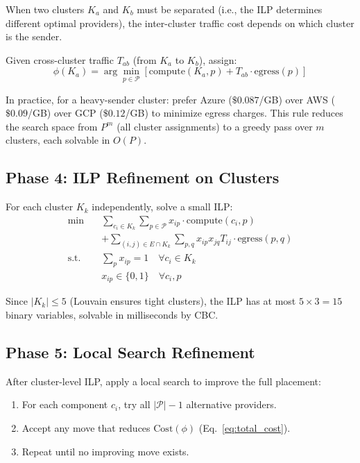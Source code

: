 \documentclass[10pt,journal,compsoc]{IEEEtran}
\begin{document}
When two clusters $K_a$ and $K_b$ must be separated (i.e., the ILP
determines different optimal providers), the inter-cluster traffic cost
depends on which cluster is the sender.

Given cross-cluster traffic $T_{ab}$ (from $K_a$ to $K_b$), assign:
\begin{equation}
\label{eq:asymmetry}
\phi(K_a) = \arg\min_{p \in \mathcal{P}} \left[ \text{compute}(K_a, p) +
             T_{ab} \cdot \text{egress}(p) \right]
\end{equation}

In practice, for a heavy-sender cluster: prefer Azure ($\$0.087$/GB) over
AWS ($\$0.09$/GB) over GCP ($\$0.12$/GB) to minimize egress charges.
This rule reduces the search space from $P^m$ (all cluster assignments) to
a greedy pass over $m$ clusters, each solvable in $O(P)$.

\subsection{Phase 4: ILP Refinement on Clusters}

For each cluster $K_k$ independently, solve a small ILP:
\begin{align}
\min \quad & \sum_{c_i \in K_k} \sum_{p \in \mathcal{P}} x_{ip} \cdot
              \text{compute}(c_i, p) \nonumber \\
           & + \sum_{(i,j) \in E \cap K_k} \sum_{p,q} x_{ip} x_{jq}
              T_{ij} \cdot \text{egress}(p, q) \label{eq:ilp} \\
\text{s.t.} \quad & \sum_{p} x_{ip} = 1 \quad \forall c_i \in K_k \\
                   & x_{ip} \in \{0, 1\} \quad \forall c_i, p
\end{align}

Since $|K_k| \leq 5$ (Louvain ensures tight clusters), the ILP has at most
$5 \times 3 = 15$ binary variables, solvable in milliseconds by CBC.

\subsection{Phase 5: Local Search Refinement}

After cluster-level ILP, apply a local search to improve the full placement:
\begin{enumerate}
  \item For each component $c_i$, try all $|\mathcal{P}| - 1$ alternative
        providers.
  \item Accept any move that reduces $\text{Cost}(\phi)$ (Eq.~\ref{eq:total_cost}).
  \item Repeat until no improving move exists.
\end{enumerate}
\end{document}
